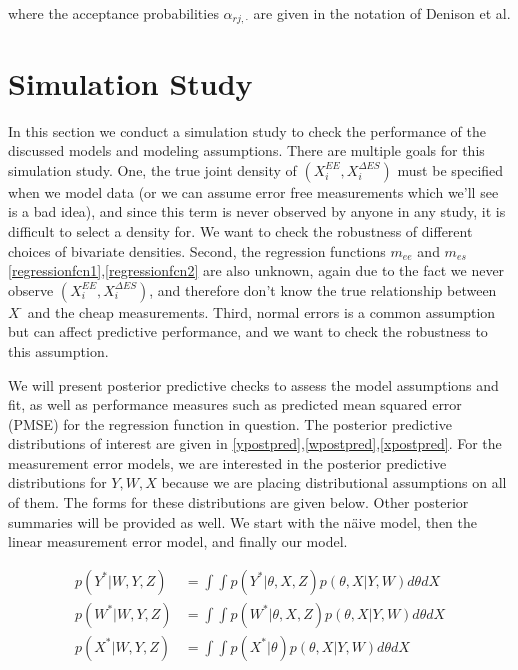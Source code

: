 \documentclass[11pt]{article}\usepackage[]{graphicx}\usepackage[]{color}
\begin{document}
where the acceptance probabilities $\alpha_{rj,\cdot}$ are given in the notation of Denison et al.

\section{Simulation Study}

In this section we conduct a simulation study to check the performance of the discussed models and modeling assumptions. There are multiple goals for this simulation study. One, the true joint density of $(X_i^{EE},X_i^{\Delta ES})$ must be specified when we model data (or we can assume error free measurements which we'll see is a bad idea), and since this term is never observed by anyone in any study, it is difficult to select a density for. We want to check the robustness of different choices of bivariate densities. Second, the regression functions $m_{ee}$ and $m_{es}$ \eqref{regressionfcn1},\eqref{regressionfcn2} are also unknown, again due to the fact we never observe $(X_i^{EE},X_i^{\Delta ES})$, and therefore don't know the true relationship between $X^{\cdot}$ and the cheap measurements. Third, normal errors  is a common assumption but  can affect predictive performance, and we want to check the robustness to this assumption.


 We will present posterior predictive checks to assess the model assumptions and fit, as well as performance measures such as predicted mean squared error (PMSE) for the regression function in question. The posterior predictive distributions of interest are given in \eqref{ypostpred},\eqref{wpostpred},\eqref{xpostpred}. For the measurement error models, we are interested in the posterior predictive distributions for $Y,W,X$ because we are placing distributional assumptions on all of them. The forms for these distributions are given below. Other posterior summaries will be provided as well. We start with the n{\"a}ive model, then the linear measurement error model, and finally our model. 
 
\begin{align}
  \label{ypostpred}
  p(Y^*|W,Y,Z) &= \int \int p(Y^*|\theta,X,Z) p(\theta, X|Y,W) d\theta dX \\
  \label{wpostpred}
  p(W^*|W,Y,Z) &= \int \int p(W^*|\theta,X,Z) p(\theta, X|Y,W) d\theta dX \\
  \label{xpostpred}
  p(X^*|W,Y,Z) &= \int \int p(X^*|\theta) p(\theta, X|Y,W) d\theta dX
\end{align}
\end{document}
